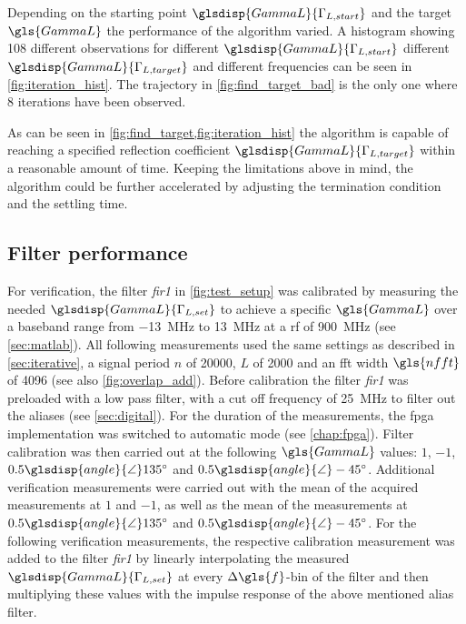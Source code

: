 \documentclass[12pt,a4paper,parskip=full,abstract=true,BCOR=12mm,twoside,open=right]{scrreprt}
\def\device#1{\textit{#1}}
\newcommand{\Angle}{\glsdisp{angle}{\angle}}
\begin{document}
Depending on the starting point $\glsdisp{GammaL}{\Gamma_{L,start}}$ and the target $\gls{GammaL}$
the performance of the algorithm varied. A histogram showing 108 different
observations for different $\glsdisp{GammaL}{\Gamma_{L,start}}$ different $\glsdisp{GammaL}{\Gamma_{L,target}}$ and
different frequencies can be seen in \cref{fig:iteration_hist}. The trajectory
in \cref{fig:find_target_bad} is the only one where 8 iterations have been observed.

As can be seen in \cref{fig:find_target,fig:iteration_hist} the algorithm is capable
of reaching a specified reflection coefficient $\glsdisp{GammaL}{\Gamma_{L,target}}$ within a reasonable
amount of time. Keeping the limitations above in mind, the algorithm could be further
accelerated by adjusting the termination condition and the settling time.

\subsection{Filter performance}
\label{sec:filter}

For verification, the filter \device{fir1} in \cref{fig:test_setup} was calibrated
by measuring the needed $\glsdisp{GammaL}{\Gamma_{L,set}}$ to achieve a specific $\gls{GammaL}$ over a
baseband range from \SI{-13}{\mega\hertz} to \SI{13}{\mega\hertz} at a \gls{rf} of %
\SI{900}{\mega\hertz} (see \cref{sec:matlab}). All following
measurements used the same settings as described in \cref{sec:iterative}, a signal period $n$ of 20000,
$L$ of 2000 and an \gls{fft} width $\gls{nfft}$ of 4096 (see also \cref{fig:overlap_add}). %
Before calibration the filter \device{fir1} was preloaded with a low pass filter, with
a cut off frequency of \SI{25}{\mega\hertz} to filter out the aliases (see
\cref{sec:digital}). For the duration of the measurements, the \gls{fpga} implementation
was switched to automatic mode (see \cref{chap:fpga}). Filter calibration was then carried out at the following $\gls{GammaL}$
values: $1$, $-1$, $0.5\Angle\SI{135}{\degree}$ and $0.5\Angle\SI{-45}{\degree}$. Additional
verification measurements were carried out with the mean of the acquired measurements
at $1$ and $-1$, as well as the mean of the measurements at $0.5\Angle\SI{135}{\degree}$
and $0.5\Angle\SI{-45}{\degree}$. For the following verification measurements, the respective
calibration measurement was added to the filter \device{fir1} by linearly interpolating %
the measured $\glsdisp{GammaL}{\Gamma_{L,set}}$ at every $\Delta{}\gls{f}$-bin of the filter and then multiplying
these values with the impulse response of the above mentioned alias filter.
\end{document}
